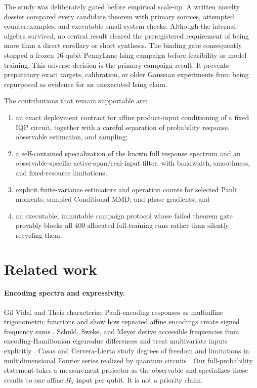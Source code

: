 \documentclass[a4paper,twocolumn,11pt,unpublished]{quantumarticle}
\begin{document}
The study was deliberately gated before empirical scale-up.  A written
novelty dossier compared every candidate theorem with primary sources,
attempted counterexamples, and executable small-system checks.  Although the
internal algebra survived, no central result cleared the preregistered
requirement of being more than a direct corollary or short synthesis.  The
binding gate consequently stopped a frozen 16-qubit PennyLane-Ising campaign
before feasibility or model training.  This adverse decision is the primary
campaign result.  It prevents preparatory exact targets, calibration, or older
Gaussian experiments from being repurposed as evidence for an unexecuted
Ising claim.

The contributions that remain supportable are:
\begin{enumerate}
\item an exact deployment contract for affine product-input conditioning of a
fixed IQP circuit, together with a careful separation of probability response,
observable estimation, and sampling;
\item a self-contained specialization of the known full response spectrum and
an observable-specific active-span/real-input filter, with bandwidth,
smoothness, and fixed-resource limitations;
\item explicit finite-variance estimators and operation counts for selected
Pauli moments, sampled Conditional MMD, and phase gradients; and
\item an executable, immutable campaign protocol whose failed theorem gate
provably blocks all 400 allocated full-training runs rather than silently
recycling them.
\end{enumerate}

\section{Related work}

\paragraph{Encoding spectra and expressivity.}
Gil Vidal and Theis characterize Pauli-encoding responses as multiaffine
trigonometric functions and show how repeated affine encodings create signed
frequency sums \cite{gilVidalInputRedundancy2020}.  Schuld, Sweke, and Meyer
derive accessible frequencies from encoding-Hamiltonian eigenvalue
differences and treat multivariate inputs explicitly
\cite{schuldEffectDataEncoding2021}.  Casas and Cervera-Lierta study degrees
of freedom and limitations in multidimensional Fourier series realized by
quantum circuits \cite{casasMultidimensionalFourier2023}.  Our
full-probability statement takes a measurement projector as the observable and
specializes those results to one affine $R_Y$ input per qubit.  It is not a
priority claim.
\end{document}
